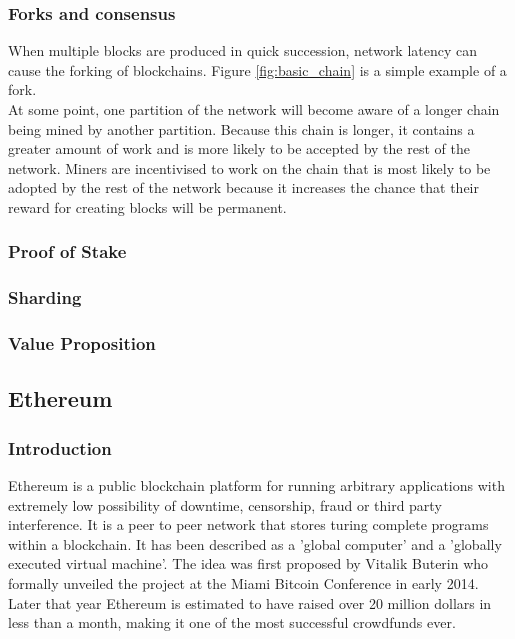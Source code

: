 \subsubsection{Forks and consensus}
When multiple blocks are produced in quick succession, network latency can cause the forking of blockchains. Figure \ref{fig:basic_chain} is a simple example of a fork. \\

At some point, one partition of the network will become aware of a longer chain being mined by another partition. Because this chain is longer, it contains a greater amount of work and is more likely to be accepted by the rest of the network. Miners are incentivised to work on the chain that is most likely to be adopted by the rest of the network because it increases the chance that their reward for creating blocks will be permanent.\\

\subsubsection{Proof of Stake}

\subsubsection{Sharding}

\subsubsection{Value Proposition}

\subsection{Ethereum}
\subsubsection{Introduction}
Ethereum is a public blockchain platform for running arbitrary applications with extremely low possibility of downtime, censorship, fraud or third party interference. It is a peer to peer network that stores turing complete programs within a blockchain. It has been described as a 'global computer' and a 'globally executed virtual machine'. The idea was first proposed by Vitalik Buterin who formally unveiled the project at the Miami Bitcoin Conference in early 2014. Later that year Ethereum is estimated to have raised over 20 million dollars in less than a month, making it one of the most successful crowdfunds ever\cite{Ethereum_crowdfund}. \\

